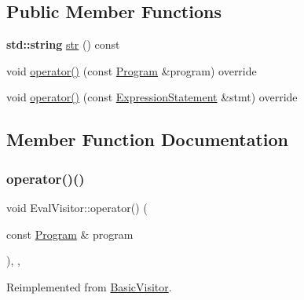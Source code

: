 \subsection*{Public Member Functions}
\begin{DoxyCompactItemize}
\item 
\textbf{ std\+::string} \hyperlink{class_eval_visitor_a999cfe6d55d85b27a6dca7c5f8c2b07e}{str} () const
\item 
void \hyperlink{class_eval_visitor_a9300ec33c193788bec2484b0d99c7fa3}{operator()} (const \hyperlink{struct_program}{Program} \&program) override
\item 
void \hyperlink{class_eval_visitor_a7122ac9fb6f1ef01696296b6bd2edbeb}{operator()} (const \hyperlink{struct_expression_statement}{Expression\+Statement} \&stmt) override
\end{DoxyCompactItemize}


\subsection{Member Function Documentation}
\mbox{\label{class_eval_visitor_a9300ec33c193788bec2484b0d99c7fa3}} 
\subsubsection{\texorpdfstring{operator()()}{operator()()}\hspace{0.1cm}{\footnotesize\ttfamily [1/2]}}
{\footnotesize\ttfamily void Eval\+Visitor\+::operator() (\begin{DoxyParamCaption}\item[{const \hyperlink{struct_program}{Program} \&}]{program }\end{DoxyParamCaption})\hspace{0.3cm}{\ttfamily [inline]}, {\ttfamily [override]}, {\ttfamily [virtual]}}



Reimplemented from \hyperlink{struct_basic_visitor_adeaf13cc53c36c871d89d6f42a1ec8db}{Basic\+Visitor}.

\mbox{\label{class_eval_visitor_a7122ac9fb6f1ef01696296b6bd2edbeb}} 
